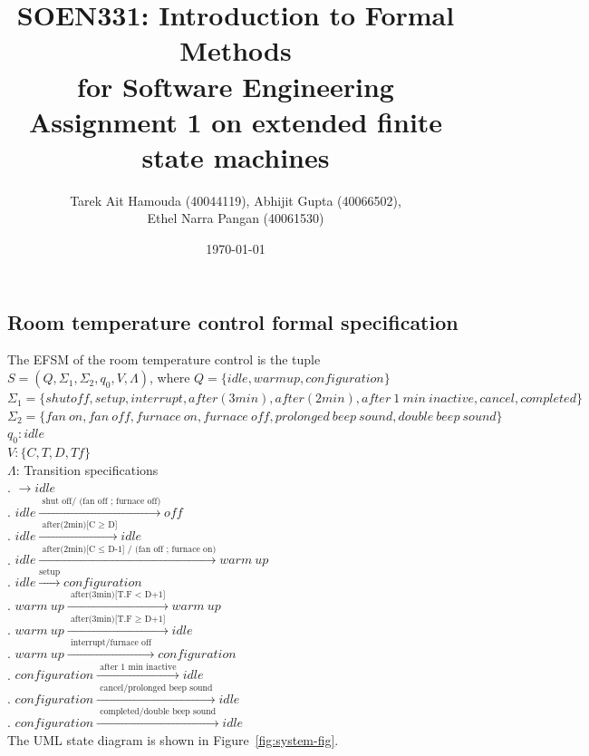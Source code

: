 \documentclass[12pt]{article}
\title{SOEN331: Introduction to Formal Methods\\for Software Engineering\\
Assignment 1 on extended finite state machines}
\author{Tarek Ait Hamouda (40044119), Abhijit Gupta (40066502),\\ 
Ethel Narra Pangan (40061530)}
\date{\today}
\begin{document}
\begin{spacing}{1.5}

\maketitle

\section{Room temperature control formal specification}

\noindent The EFSM of the room temperature control is the tuple $S = (Q, \Sigma_1, \Sigma_2, q_0, V, \Lambda)$, where
\noindent $Q = \{idle, warm up, configuration\}$\\
\noindent $\Sigma_1 = \{shut off, setup, interrupt, after(3min), after(2min), after~1~min~inactive, cancel, completed\}$\\
\noindent $\Sigma_2 = \{fan~on, fan~off, furnace~on, furnace~off, prolonged~beep~sound, double~beep~sound\}$\\
\noindent $q_0: idle$\\
\noindent $V: \{C, T, D, Tf\}$\\
\noindent $\Lambda$: Transition specifications\\
. $\rightarrow idle$\\
. $idle \xrightarrow {\text { shut off/ (fan off ; furnace off)}} off$\\
. $idle \xrightarrow {\text { after(2min)[C $\geq$ D]}} idle$\\
. $idle \xrightarrow {\text { after(2min)[C $\leq$ D-1] / (fan off ; furnace on)}} warm~up$\\
. $idle \xrightarrow {\text {setup}} configuration$\\
. $warm~up \xrightarrow {\text { after(3min)[T.F $<$ D+1] }} warm~up$\\
. $warm~up \xrightarrow {\text { after(3min)[T.F $\geq$ D+1] }} idle$\\
. $warm~up \xrightarrow {\text { interrupt/furnace off }} configuration$\\
. $configuration \xrightarrow {\text { after 1 min inactive }} idle$\\
. $configuration \xrightarrow {\text { cancel/prolonged beep sound }} idle$\\
. $configuration \xrightarrow {\text { completed/double beep sound }} idle$\\
\noindent The UML state diagram is shown in Figure~\ref{fig:system-fig}.\\\\


\end{spacing}
\end{document}

